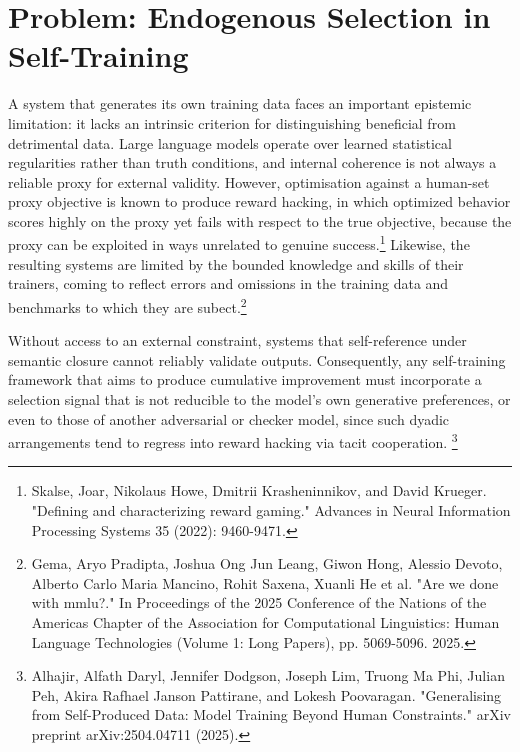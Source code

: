 \documentclass{article}
\begin{document}
\section[Problem: Endogenous Selection in Self-Training]{Problem: Endogenous Selection in \\ Self-Training}
A system that generates its own training data faces an important epistemic limitation: it lacks an intrinsic criterion for distinguishing beneficial from detrimental data. Large language models operate over learned statistical regularities rather than truth conditions, and internal coherence is not always a reliable proxy for external validity. However, optimisation against a human-set proxy objective is known to produce reward hacking, in which optimized behavior scores highly on the proxy yet fails with respect to the true objective, because the proxy can be exploited in ways unrelated to genuine success.\footnote{Skalse, Joar, Nikolaus Howe, Dmitrii Krasheninnikov, and David Krueger. "Defining and characterizing reward gaming." Advances in Neural Information Processing Systems 35 (2022): 9460-9471.} Likewise, the resulting systems are limited by the bounded knowledge and skills of their trainers, coming to reflect errors and omissions in the training data and benchmarks to which they are subect.\footnote{Gema, Aryo Pradipta, Joshua Ong Jun Leang, Giwon Hong, Alessio Devoto, Alberto Carlo Maria Mancino, Rohit Saxena, Xuanli He et al. "Are we done with mmlu?." In Proceedings of the 2025 Conference of the Nations of the Americas Chapter of the Association for Computational Linguistics: Human Language Technologies (Volume 1: Long Papers), pp. 5069-5096. 2025.}

Without access to an external constraint, systems that self-reference under semantic closure cannot reliably validate outputs. Consequently, any self-training framework that aims to produce cumulative improvement must incorporate a selection signal that is not reducible to the model’s own generative preferences, or even to those of another adversarial or checker model, since such dyadic arrangements tend to regress into reward hacking via tacit cooperation. \footnote{Alhajir, Alfath Daryl, Jennifer Dodgson, Joseph Lim, Truong Ma Phi, Julian Peh, Akira Rafhael Janson Pattirane, and Lokesh Poovaragan. "Generalising from Self-Produced Data: Model Training Beyond Human Constraints." arXiv preprint arXiv:2504.04711 (2025).}
\end{document}
